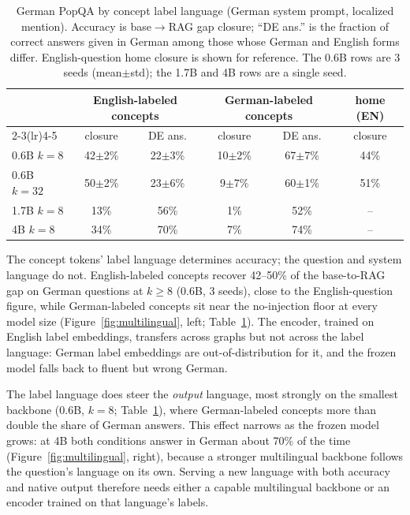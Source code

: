 \documentclass{article}
\begin{document}
\begin{table}[t]
  \caption{German PopQA by concept label language (German system prompt, localized mention).
  Accuracy is base$\to$RAG gap closure; ``DE ans.'' is the fraction of correct answers given
  in German among those whose German and English forms differ. English-question home closure
  is shown for reference. The 0.6B rows are 3 seeds (mean$\pm$std); the 1.7B and 4B rows are a
  single seed.}
  \label{tab:multilingual}
  \centering
  \small
  \begin{tabular}{lccccc}
    \toprule
    & \multicolumn{2}{c}{English-labeled concepts} & \multicolumn{2}{c}{German-labeled concepts} & home (EN)\\
    \cmidrule(lr){2-3}\cmidrule(lr){4-5}
    & closure & DE ans. & closure & DE ans. & closure\\
    \midrule
    0.6B $k{=}8$ & 42$\pm$2\% & 22$\pm$3\% & 10$\pm$2\% & 67$\pm$7\% & 44\%\\
    0.6B $k{=}32$ & 50$\pm$2\% & 23$\pm$6\% & 9$\pm$7\% & 60$\pm$1\% & 51\%\\
    1.7B $k{=}8$ & 13\% & 56\% & 1\% & 52\% & --\\
    4B $k{=}8$ & 34\% & 70\% & 7\% & 74\% & --\\
    \bottomrule
  \end{tabular}
\end{table}

The concept tokens' label language determines accuracy; the question and system language do
not. English-labeled concepts recover 42--50\% of the base-to-RAG gap on German
questions at $k{\ge}8$ (0.6B, 3 seeds), close to the English-question figure, while German-labeled
concepts sit near the no-injection floor at every model size
(Figure~\ref{fig:multilingual}, left; Table~\ref{tab:multilingual}). The encoder, trained on
English label embeddings, transfers across graphs but not across the label language: German
label embeddings are out-of-distribution for it, and the frozen model falls back to fluent
but wrong German.

The label language does steer the \emph{output} language, most strongly on the smallest
backbone (0.6B, $k{=}8$; Table~\ref{tab:multilingual}), where German-labeled concepts more than
double the share of German answers. This effect narrows as the frozen model grows: at 4B both
conditions answer in German about 70\% of the time (Figure~\ref{fig:multilingual}, right),
because a stronger multilingual backbone follows the question's language on its own. Serving a
new language with both accuracy and native output therefore needs either a capable multilingual
backbone or an encoder trained on that language's labels.
\end{document}
